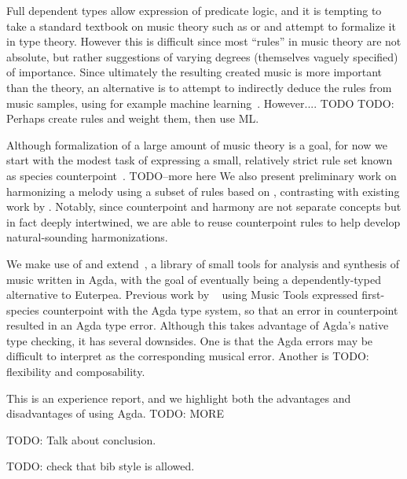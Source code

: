 Full dependent types allow expression of predicate logic, and it is
tempting to take a standard textbook on music theory such as
\citet{piston-harmony} or \citet{aldwell2018harmony} and attempt to
formalize it in type theory. However this is difficult since most
``rules'' in music theory are not absolute, but rather suggestions of
varying degrees (themselves vaguely specified) of importance. Since
ultimately the resulting created music is more important than the
theory, an alternative is to attempt to indirectly deduce the rules
from music samples, using for example machine
learning~\citep{huang-cp}. However.... TODO
TODO: Perhaps create rules and weight them, then use ML.

Although formalization of a large amount of music theory is a goal,
for now we start with the modest task of expressing a small,
relatively strict rule set known as species
counterpoint~\cite{fux-cp}. TODO--more here
We also present preliminary work on harmonizing a melody using
a subset of rules based on \citet{piston-harmony}, contrasting with
existing work by \citet{koops-fharm}. Notably, since counterpoint and
harmony are not separate concepts but in fact deeply intertwined, we
are able to reuse counterpoint rules to help develop natural-sounding
harmonizations.

We make use of and extend~\citet{MusicTools}, a library of small tools
for analysis and synthesis of music written in Agda, with the goal
of eventually being a dependently-typed alternative to Euterpea. 
Previous work by ~\citet{cong-cp} using Music Tools expressed
first-species counterpoint with the Agda type system, so that an error
in counterpoint resulted in an Agda type error. Although this takes
advantage of Agda's native type checking, it has several
downsides. One is that the Agda errors may be difficult to interpret
as the corresponding musical error. Another is TODO: flexibility and
composability.

This is an experience report, and we highlight both the advantages and
disadvantages of using Agda. TODO: MORE

TODO: Talk about conclusion.

TODO: check that bib style is allowed.
